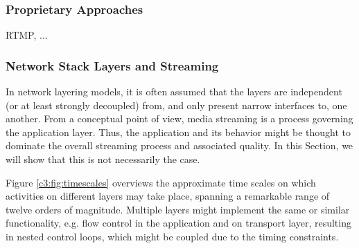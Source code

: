 \subsubsection{Proprietary Approaches}

RTMP, ...




\subsubsection{Network Stack Layers and Streaming}
\label{sec:analysis}

In network layering models, it is often assumed that the layers are independent (or at least strongly decoupled) from, and only present narrow interfaces to, one another. From a conceptual point of view, media streaming is a process governing the application layer. Thus, the application and its behavior might be thought to dominate the overall streaming process and associated quality. In this Section, we will show that this is not necessarily the case.

Figure \ref{c3:fig:timescales} overviews the approximate time scales on which activities on different layers may take place, spanning a remarkable range of twelve orders of magnitude. Multiple layers might implement the same or similar functionality, e.g. flow control in the application and on transport layer, resulting in nested control loops, which might be coupled due to the timing constraints. 

